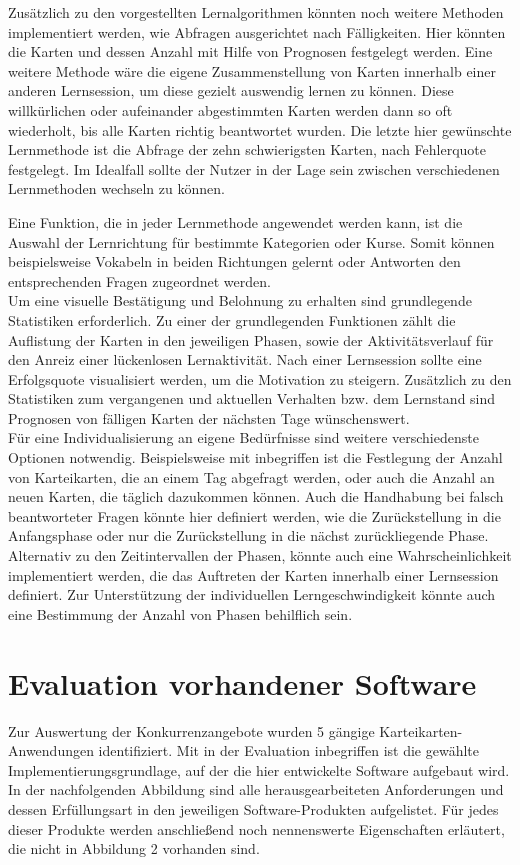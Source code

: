 Zusätzlich zu den vorgestellten Lernalgorithmen könnten noch weitere Methoden implementiert werden, wie Abfragen ausgerichtet nach Fälligkeiten. Hier könnten die Karten und dessen Anzahl mit Hilfe von Prognosen festgelegt werden. Eine weitere Methode wäre die eigene Zusammenstellung von Karten innerhalb einer anderen Lernsession, um diese gezielt auswendig lernen zu können. Diese willkürlichen oder aufeinander abgestimmten Karten werden dann so oft wiederholt, bis alle Karten richtig beantwortet wurden. Die letzte hier gewünschte Lernmethode ist die Abfrage der zehn schwierigsten Karten, nach Fehlerquote festgelegt. Im Idealfall sollte der Nutzer in der Lage sein zwischen verschiedenen Lernmethoden wechseln zu können. 

Eine Funktion, die in jeder Lernmethode angewendet werden kann, ist die Auswahl der Lernrichtung für bestimmte Kategorien oder Kurse. Somit können beispielsweise Vokabeln in beiden Richtungen gelernt oder Antworten den entsprechenden Fragen zugeordnet werden. \\

Um eine visuelle Bestätigung und Belohnung zu erhalten sind grundlegende Statistiken erforderlich. Zu einer der grundlegenden Funktionen zählt die Auflistung der Karten in den jeweiligen Phasen, sowie der Aktivitätsverlauf für den Anreiz einer lückenlosen Lernaktivität. Nach einer Lernsession sollte eine Erfolgsquote visualisiert werden, um die Motivation zu steigern. Zusätzlich zu den Statistiken zum vergangenen und aktuellen Verhalten bzw. dem Lernstand sind Prognosen von fälligen Karten der nächsten Tage wünschenswert. \\

Für eine Individualisierung an eigene Bedürfnisse sind weitere verschiedenste Optionen notwendig. Beispielsweise mit inbegriffen ist die Festlegung der Anzahl von Karteikarten, die an einem Tag abgefragt werden, oder auch die Anzahl an neuen Karten, die täglich dazukommen können. Auch die Handhabung bei falsch beantworteter Fragen könnte hier definiert werden, wie die Zurückstellung in die Anfangsphase oder nur die Zurückstellung in die nächst zurückliegende Phase. Alternativ zu den Zeitintervallen der Phasen, könnte auch eine Wahrscheinlichkeit implementiert werden, die das Auftreten der Karten innerhalb einer Lernsession definiert. Zur Unterstützung der individuellen Lerngeschwindigkeit könnte auch eine Bestimmung der Anzahl von Phasen behilflich sein. 



\section{Evaluation vorhandener Software}
Zur Auswertung der Konkurrenzangebote wurden 5 gängige Karteikarten-Anwendungen identifiziert. Mit in der Evaluation inbegriffen ist die gewählte Implementierungsgrundlage, auf der die hier entwickelte Software aufgebaut wird. In der nachfolgenden Abbildung sind alle herausgearbeiteten Anforderungen und dessen Erfüllungsart in den jeweiligen Software-Produkten aufgelistet. Für jedes dieser Produkte werden anschließend noch nennenswerte Eigenschaften erläutert, die nicht in Abbildung 2 vorhanden sind.

